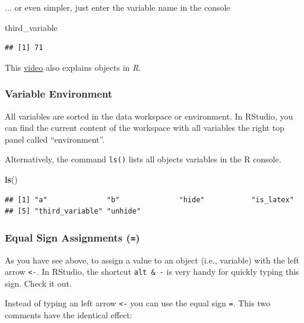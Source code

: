 \documentclass[
]{scrartcl}
\newenvironment{Shaded}{\begin{snugshade}}{\end{snugshade}}
\newcommand{\FunctionTok}[1]{\textcolor[rgb]{0.13,0.29,0.53}{\textbf{#1}}}
\newcommand{\NormalTok}[1]{#1}
\newenvironment{simple}
        {}
        {}
\begin{document}
\(\ldots\) or even simpler, just enter the variable name in the console

\begin{Shaded}
\begin{Highlighting}[]
\NormalTok{third\_variable}
\end{Highlighting}
\end{Shaded}

\begin{verbatim}
## [1] 71
\end{verbatim}

\begin{simple}
This \href{https://vimeo.com/220493412}{video} also explains objects in
\emph{R}.
\end{simple}

\subsubsection{Variable Environment}\label{variable-environment}

All variables are sorted in the data workspace or environment. In RStudio, you can find the current content of the workspace with all variables the right top panel called ``environment''.

Alternatively, the command \texttt{ls()} lists all objects variables in the R console.

\begin{Shaded}
\begin{Highlighting}[]
\FunctionTok{ls}\NormalTok{()}
\end{Highlighting}
\end{Shaded}

\begin{verbatim}
## [1] "a"              "b"              "hide"           "is_latex"      
## [5] "third_variable" "unhide"
\end{verbatim}

\subsubsection{\texorpdfstring{Equal Sign Assignments (\texttt{=})}{Equal Sign Assignments (=)}}\label{assign}

As you have see above, to assign a value to an object (i.e., variable) with the left arrow \texttt{\textless{}-}. In RStudio, the shortcut \texttt{alt\ \&\ -} is very handy for quickly typing this sign. Check it out.

Instead of typing an left arrow \texttt{\textless{}-} you can use the equal sign \texttt{=}. This two comments have the identical effect:
\end{document}
